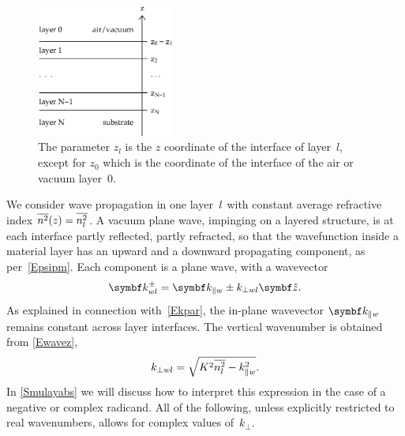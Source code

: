 \begin{figure}[tb]
\begin{center}
\includegraphics[width=0.4\textwidth]{fig/drawing/multilayer_z_conventions.ps}
\end{center}
\caption{The parameter $z_l$ is the $z$ coordinate of the  interface
%
%
%
%
of layer~$l$, except for $z_0$ which is the coordinate of the  interface
of the air or vacuum layer~0.}
\label{Fdefz}
\end{figure}

We consider wave propagation in one layer~$l$
%
with constant average refractive index $\overline{n^2}(z)=\overline{n_l^2}$.
A vacuum plane wave, impinging on a layered structure,
is at each interface partly reflected, partly refracted,
so that the wavefunction inside a material layer
has an upward and a downward propagating component,
as per~\cref{Epsipm}.
Each component is a plane wave,
with a wavevector
\begin{equation}\label{Ekpmwj3}
  \k^\pm_{w\il}= \k_{\plll w} \pm k_{\perp w\il}\v{\hat z}.
\end{equation}
%
%
As explained in connection with~\cref{Ekpar},
the in-plane wavevector $\k_{\plll w}$ remains constant
across layer interfaces.
The vertical wavenumber is obtained from \cref{Ewavez},
\begin{equation}\label{Ekperpwj}
  k_{\perp wl} = \sqrt{K^2 \overline{n_l^2} - k_{\parallel w}^2}.
\end{equation}
In \cref{Smulayabs} we will discuss how to interpret this expression
in the case of a negative or complex radicand.
All of the following, unless explicitly restricted to real wavenumbers,
allows for complex values of~$k_\perp$.

